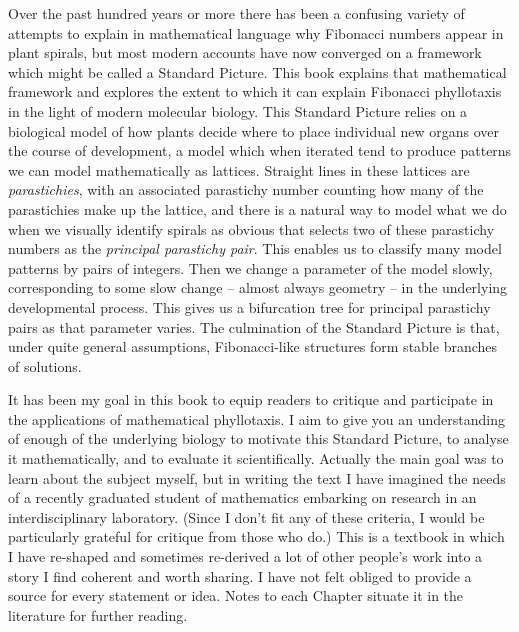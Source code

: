 

\preface


Over the past hundred years or more there has been a confusing variety of attempts to explain in mathematical language why Fibonacci numbers appear in plant spirals, but most modern accounts have now converged on a framework which might be called a Standard Picture. This book explains that mathematical framework and explores the extent to which it can explain Fibonacci phyllotaxis in the light of modern molecular biology.
 This Standard Picture relies on a biological model of how plants decide where to place individual new  organs over the course of development,
a model which when iterated tend to produce patterns we can model mathematically as lattices. Straight lines in these lattices are \textit{parastichies}, with an associated parastichy number counting how many of the parastichies make up the lattice, and there is a natural way to model what we do when we visually identify spirals as obvious that selects two of these parastichy numbers as the \textit{principal parastichy pair}.  This enables us to classify many model patterns by pairs of integers. Then we change a parameter of the model slowly, corresponding to some slow change -- almost always geometry -- in the underlying developmental process. This gives us a bifurcation tree for principal parastichy pairs as that parameter varies. The culmination of the Standard Picture is that, under quite general assumptions, Fibonacci-like structures form  stable branches of solutions.

It has been my goal in this book to equip readers to critique and participate in the applications of mathematical phyllotaxis.  I aim to give you an understanding of enough of the underlying biology to motivate this Standard Picture, to analyse it mathematically, and to evaluate it scientifically. Actually the main goal was to learn about the subject myself, but in writing the text I have imagined the needs of a recently graduated student of mathematics embarking on research in an interdisciplinary laboratory. (Since I don't fit any of these criteria, I would be particularly grateful for critique from those who do.) This is a textbook in which I have re-shaped and sometimes  re-derived a lot of other people's work into a story I find coherent and worth sharing. I have not felt obliged to provide a source for every statement or idea. Notes to each Chapter situate it in the literature for further reading. 


